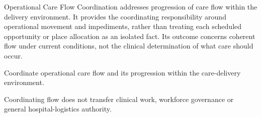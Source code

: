 Operational Care Flow Coordination addresses progression of care flow within the delivery environment. It provides the coordinating responsibility around operational movement and impediments, rather than treating each scheduled opportunity or place allocation as an isolated fact. Its outcome concerns coherent flow under current conditions, not the clinical determination of what care should occur.



Coordinate operational care flow and its progression within the care-delivery environment.



Coordinating flow does not transfer clinical work, workforce governance or general hospital-logistics authority.


